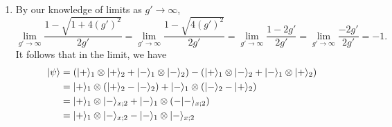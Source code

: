 \documentclass[11pt, letterpaper]{article}
\begin{document}
\begin{enumerate}
\begin{enumerate}
\[\begin{pmatrix}
				-1 & g' & g' & 0 \\
				g' & 1 & 0 & g' \\
				g' & 0 & 1 & g' \\
				0 & g' & g' & -1
				\end{pmatrix}\begin{pmatrix}
				1 \\
				\Omega  \\
				\Omega  \\
				1
				\end{pmatrix}=\begin{pmatrix}
				-1+2g'\Omega  \\
				2g'+\Omega  \\
				2g'+\Omega  \\
				-1+2g'\Omega 
				\end{pmatrix}
			.\]
			Note that our eigenvalue is $\lambda =-\sqrt{4(g')^2+1} $, which satisfies
			\[
				\Omega =\frac{1+\lambda }{2g'} \implies \lambda =2g'\Omega -1
			.\]
			This immediately checks the top and bottom entries of $H\ket{\psi } $, so it suffices to show $\lambda \Omega =2g'+\Omega $. We have
			\begin{align*}
				\left( -\sqrt{4(g')^2+1}  \right) \left( \frac{1-\sqrt{4(g')^2+1} }{2g'}  \right) &=\frac{4(g')^2+1-\sqrt{4(g')^2+1}}{2g'}  \\
														  &=2g'+\frac{1-\sqrt{4(g')^2+1} }{2g'} \\
														  &=2g'+\Omega 
			.\end{align*}
			Therefore, $H\ket{\psi } =\lambda \ket{\psi } $.
		\item By our knowledge of limits as $g'\to \infty $,
			\[
				\lim_{g' \to \infty} \frac{1-\sqrt{1+4(g')^2} }{2g'} =\lim_{g' \to \infty} \frac{1-\sqrt{4(g')^2} }{2g'} =\lim_{g' \to \infty} \frac{1-2g'}{2g'} =\lim_{g' \to \infty} \frac{-2g'}{2g'} =-1
			.\]
			It follows that in the limit, we have
			\begin{align*}
				\ket{\psi } &=\left( \ket{+}_1 \otimes \ket{+}_2+\ket{-}_1 \otimes \ket{-}_2 \right) -\left( \ket{+}_1 \otimes \ket{-}_2+\ket{-}_1 \otimes \ket{+}_2 \right) \\
					    &=\ket{+}_1 \otimes \left( \ket{+}_2  -\ket{-}_2 \right) +\ket{-}_1 \otimes \left( \ket{-}_2 -\ket{+}_2 \right) \\
					    &=\ket{+}_1 \otimes \ket{-}_{x;2} +\ket{-}_1 \otimes (-\ket{-}_{x;2}) \\
					    &=\ket{+}_1 \otimes \ket{-}_{x;2} -\ket{-}_1 \otimes \ket{-}_{x;2} \\

\end{align*}
\end{enumerate}
\end{enumerate}
\end{document}
